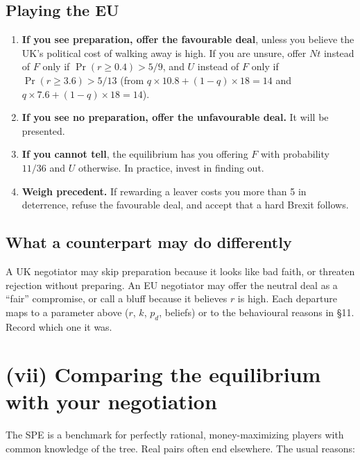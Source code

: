 \documentclass[11pt,a4paper]{article}
\newcommand{\Nt}{\mathit{Nt}}
\newcommand{\dF}{\mathit{F}}
\newcommand{\dU}{\mathit{U}}
\begin{document}
\subsection*{Playing the EU}
\begin{enumerate}
  \item \textbf{If you see preparation, offer the favourable deal}, unless you believe the UK's
    political cost of walking away is high. If you are unsure, offer $\Nt$ instead of $\dF$ only if
    $\Pr(r\ge0.4)>5/9$, and $\dU$ instead of $\dF$ only if $\Pr(r\ge3.6)>5/13$ (from
    $q\times10.8+(1-q)\times18=14$ and $q\times7.6+(1-q)\times18=14$).
  \item \textbf{If you see no preparation, offer the unfavourable deal.} It will be presented.
  \item \textbf{If you cannot tell}, the equilibrium has you offering $\dF$ with probability
    $11/36$ and $\dU$ otherwise. In practice, invest in finding out.
  \item \textbf{Weigh precedent.} If rewarding a leaver costs you more than 5 in deterrence, refuse
    the favourable deal, and accept that a hard Brexit follows.
\end{enumerate}

\subsection*{What a counterpart may do differently}
A UK negotiator may skip preparation because it looks like bad faith, or threaten rejection without
preparing. An EU negotiator may offer the neutral deal as a ``fair'' compromise, or call a bluff
because it believes $r$ is high. Each departure maps to a parameter above ($r$, $k$, $p_d$, beliefs)
or to the behavioural reasons in \S11. Record which one it was.

\section{(vii) Comparing the equilibrium with your negotiation}

The SPE is a benchmark for perfectly rational, money-maximizing players with common knowledge
of the tree. Real pairs often end elsewhere. The usual reasons:
\end{document}
